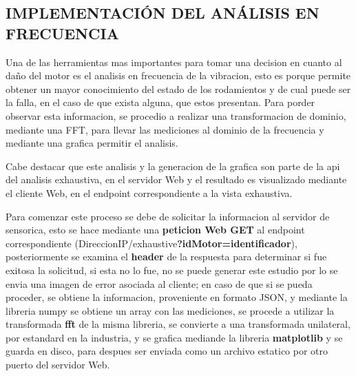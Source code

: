 
\subsection{IMPLEMENTACIÓN DEL ANÁLISIS EN FRECUENCIA}

Una de las herramientas mas importantes para tomar una decision en cuanto
al daño del motor es el analisis en frecuencia de la vibracion, esto es porque
permite obtener un mayor conocimiento del estado de los rodamientos y de cual
puede ser la falla, en el caso de que exista alguna, que estos presentan. Para
porder observar esta informacion, se procedio a realizar una transformacion de
dominio, mediante una FFT, para llevar las mediciones al dominio de la frecuencia
y mediante una grafica permitir el analisis.

Cabe destacar que este analisis y la generacion de la grafica son parte de la
api del analisis exhaustiva, en el servidor Web y el resultado es visualizado
mediante el cliente Web, en el endpoint correspondiente a la vista exhaustiva.

Para comenzar este proceso se debe de solicitar la informacion al servidor de
sensorica, esto se hace mediante una \textbf{peticion Web GET} al endpoint
correspondiente (DireccionIP/exhaustive\textbf{?idMotor=identificador}), posteriormente
se examina el \textbf{header} de la respuesta para determinar si fue exitosa
la solicitud, si esta no lo fue, no se puede generar este estudio por lo se envia una
imagen de error asociada al cliente; en caso de que si se pueda proceder, se
obtiene la informacion, proveniente en formato JSON, y mediante la libreria
numpy se obtiene un array con las mediciones, se procede a utilizar la transformada
\textbf{fft} de la misma libreria, se convierte a una transformada unilateral,
por estandard en la industria, y se grafica mediande la libreria \textbf{matplotlib}
y se guarda en disco, para despues ser enviada como un archivo estatico por otro
puerto del servidor Web.
